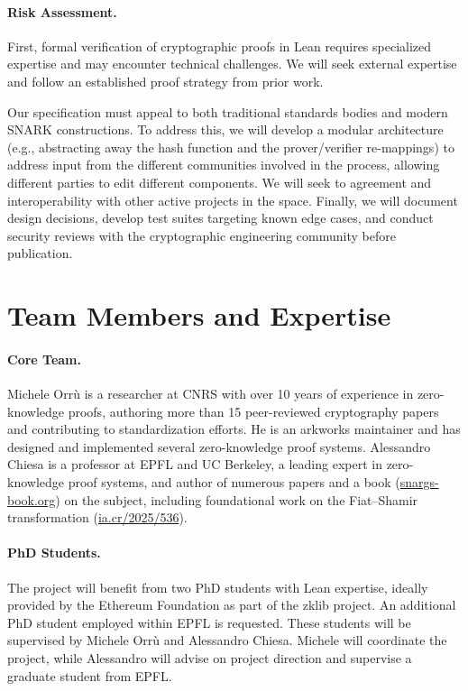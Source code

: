 \documentclass{article}
\begin{document}
\paragraph{Risk Assessment.}
First, formal verification of cryptographic proofs in Lean requires specialized expertise and may encounter technical challenges. We will seek external expertise and follow an established proof strategy from prior work.

Our specification must appeal to both traditional standards bodies and modern SNARK constructions. To address this, we will develop a modular architecture (e.g., abstracting away the hash function and the prover/verifier re-mappings) to address input from the different communities involved in the process, allowing different parties to edit different components. We will seek to agreement and interoperability with other active projects in the space.
Finally, we will document design decisions, develop test suites targeting known edge cases, and conduct security reviews with the cryptographic engineering community before publication.

\section{Team Members and Expertise}

\paragraph{Core Team.}
Michele Orrù is a researcher at CNRS with over 10 years of experience in zero-knowledge proofs, authoring more than 15 peer-reviewed cryptography papers and contributing to standardization efforts. He is an arkworks maintainer and has designed and implemented several zero-knowledge proof systems.
Alessandro Chiesa is a professor at EPFL and UC Berkeley, a leading expert in zero-knowledge proof systems, and author of numerous papers and a book (\href{https://snargs-book.org/}{snargs-book.org}) on the subject, including foundational work on the Fiat--Shamir transformation (\href{https://eprint.iacr.org/2025/536.pdf}{ia.cr/2025/536}).

\paragraph{PhD Students.}
The project will benefit from two PhD students with Lean expertise, ideally provided by the Ethereum Foundation as part of the zklib project. An additional PhD student employed within EPFL is requested. These students will be supervised by Michele Orrù and Alessandro Chiesa. Michele will coordinate the project, while Alessandro will advise on project direction and supervise a graduate student from EPFL.
\end{document}
